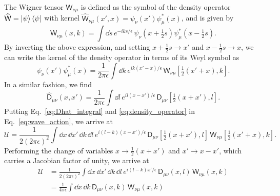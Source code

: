 The Wigner tensor $\mathsf{W}_{\nu\mu}$ is defined as the symbol of the density operator $\widehat{\mathsf{W}} = \mathinner{\lvert{\psi}\rangle}\mathinner{\langle{\psi}\rvert}$ with kernel $\widehat{\mathsf{W}}_{\nu\mu}(x',x) = \psi_{\nu}(x')\psi_{\mu}^{*}(x)$, and is given by
%
\begin{equation}
  \mathsf{W}_{\nu\mu}(x, k) = \int \dd{s}\, e^{-iks/\epsilon}\, \psi_{\nu}\left(x + \tfrac{1}{2}s\right)\psi^{*}_{\mu}\left(x - \tfrac{1}{2}s\right).
\end{equation}
%
By inverting the above expression, and setting $x + \tfrac{1}{2}s \to x'$ and $x- \tfrac{1}{2}s \to x$, we can write the kernel of the density operator in terms of its Weyl symbol as
%
%
\begin{equation}
  \psi_{\nu}(x') \psi^{*}_{\mu}(x) = \frac{1}{2\pi \epsilon} \int \dd{k}\, e^{ik(x' -x)/\epsilon}\,\mathsf{W}_{\nu\mu}\left[\tfrac{1}{2}(x' + x), k\right].
  \label{eq:density_operator}
\end{equation}
%
In a similar fashion, we find
%
\begin{equation}
  \widehat{\mathsf{D}}_{\mu\nu}(x, x') = \frac{1}{2\pi\epsilon} \int \dd{l}\, e^{il(x -x')/\epsilon}\,\mathsf{D}_{\mu\nu}\left[\tfrac{1}{2}(x + x'), l\right].
  \label{eq:Dhat_integral}
\end{equation}
%
Putting Eq.~\eqref{eq:Dhat_integral} and \eqref{eq:density_operator} in Eq.~\eqref{eq:wave_action}, we arrive at
%
\begin{equation}
  \mathscr{U} = \frac{1}{2(2\pi\epsilon)^{2}}\int \dd{x}\,\dd{x'}\,\dd{k}\,\dd{l}\, e^{i(l-k)(x -x')/\epsilon}\,\mathsf{D}_{\mu\nu}\left[\tfrac{1}{2}(x + x'), l\right]\, \mathsf{W}_{\nu\mu}\left[\tfrac{1}{2}(x' + x), k\right].
\end{equation}
%
Performing the change of variables $x \to \tfrac{1}{2}(x + x')$ and $x' \to x - x'$, which carries a Jacobian factor of unity, we arrive at
%
\begin{equation}
  \begin{aligned}
    \mathscr{U} &= \frac{1}{2(2\pi\epsilon)^{2}}\int \dd{x}\,\dd{x'}\,\dd{k}\,\dd{l}\, e^{i(l-k)x'/\epsilon}\,\mathsf{D}_{\mu\nu}(x, l)\,\mathsf{W}_{\nu\mu}(x, k)\\
                &= \frac{1}{4\pi\epsilon}\int \dd{x}\,\dd{k}\,\mathsf{D}_{\mu\nu}(x, k)\,\mathsf{W}_{\nu\mu}(x,k)\\
  \end{aligned}
  \label{eq:wave_action_symbol_form}
\end{equation}

